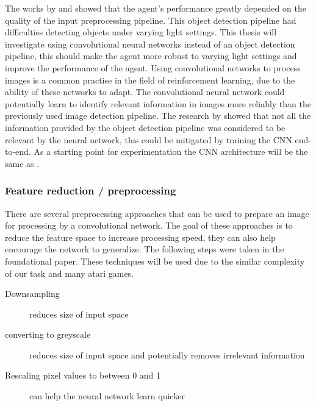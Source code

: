The works by \autocite{merlin_flach} and \autocite{maximilian} showed that the agent's performance greatly depended on the quality of the input preprocessing pipeline. This object detection pipeline had difficulties detecting objects under varying light settings. This thesis will investigate using convolutional neural networks instead of an object detection pipeline, this should make the agent more robust to varying light settings and improve the performance of the agent.
Using convolutional networks to process images is a common practise in the field of reinforcement learning, due to the ability of these networks to adapt. The convolutional neural network could potentially learn to identify relevant information in images more reliably than the previously used image detection pipeline. The research by \autocite{merlin_flach} showed that not all the information provided by the object detection pipeline was considered to be relevant by the neural network, this could be mitigated by training the CNN end-to-end.
As a starting point for experimentation the CNN architecture will be the same as \autocite{human_level_control}.




\subsubsection{Feature reduction / preprocessing}

There are several preprocessing approaches that can be used to prepare an image for processing by a convolutional network. The goal of these approaches is to reduce the feature space to increase processing speed, they can also help encourage the network to generalize. The following steps were taken in the foundational \autocite{atari} paper. These techniques will be used due to the similar complexity of our task and many atari games.

\begin{description}
     \item[Downsampling] reduces size of input space
     \item[converting to greyscale] reduces size of input space and potentially removes irrelevant information
     \item[Rescaling pixel values to between 0 and 1] can help the neural network learn quicker %
\end{description}


